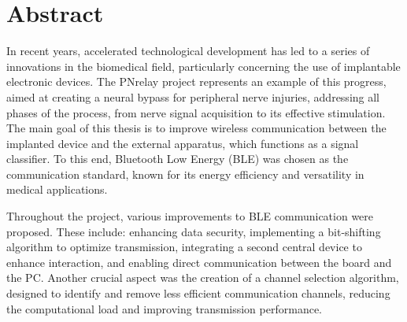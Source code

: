 \documentclass{Configuration_Files/PoliMi3i_thesis}
\begin{document}


\pagestyle{empty} %
\frontmatter %


\startpreamble
\setcounter{page}{1} %

\chapter*{Abstract} 

In recent years, accelerated technological development has led to a series of innovations in the biomedical field, particularly concerning the use of implantable electronic devices. The PNrelay project represents an example of this progress, aimed at creating a neural bypass for peripheral nerve injuries, addressing all phases of the process, from nerve signal acquisition to its effective stimulation. The main goal of this thesis is to improve wireless communication between the implanted device and the external apparatus, which functions as a signal classifier. To this end, Bluetooth Low Energy (BLE) was chosen as the communication standard, known for its energy efficiency and versatility in medical applications.

Throughout the project, various improvements to BLE communication were proposed. These include: enhancing data security, implementing a bit-shifting algorithm to optimize transmission, integrating a second central device to enhance interaction, and enabling direct communication between the board and the PC. Another crucial aspect was the creation of a channel selection algorithm, designed to identify and remove less efficient communication channels, reducing the computational load and improving transmission performance.
\end{document}
